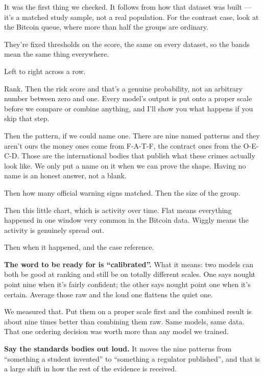 \documentclass[11pt]{article}
\begin{document}
\begin{asked}
 It was the first thing we checked. It follows
from how that dataset was built --- it's a matched study sample, not a real
population. For the contrast case, look at the Bitcoin queue, where more than
half the groups are ordinary.

 They're fixed thresholds on the
score, the same on every dataset, so the bands mean the same thing everywhere.
\end{asked}


\begin{saythis}
Left to right across a row.

Rank. Then the risk score \bt and that's a genuine probability, not an
arbitrary number between zero and one. Every model's output is put onto a
proper scale before we compare or combine anything, and I'll show you what
happens if you skip that step.

Then the pattern, if we could name one. There are nine named patterns and they
aren't ours \bt the money ones come from F-A-T-F, the contract ones from the
O-E-C-D. Those are the international bodies that publish what these crimes
actually look like. We only put a name on it when we can prove the shape.
Having no name is an honest answer, not a blank.

Then how many official warning signs matched. Then the size of the group.

Then this little chart, which is activity over time. Flat means everything
happened in one window \bt very common in the Bitcoin data. Wiggly means the
activity is genuinely spread out.

Then when it happened, and the case reference.
\end{saythis}

\begin{means}
\textbf{The word to be ready for is ``calibrated''.} What it means: two models
can both be good at ranking and still be on totally different scales. One says
nought point nine when it's fairly confident; the other says nought point one
when it's certain. Average those raw and the loud one flattens the quiet one.

We measured that. Put them on a proper scale first and the combined result is
about nine times better than combining them raw. Same models, same data. That
one ordering decision was worth more than any model we trained.

\textbf{Say the standards bodies out loud.} It moves the nine patterns from
``something a student invented'' to ``something a regulator published'', and
that is a large shift in how the rest of the evidence is received.
\end{means}
\end{document}

